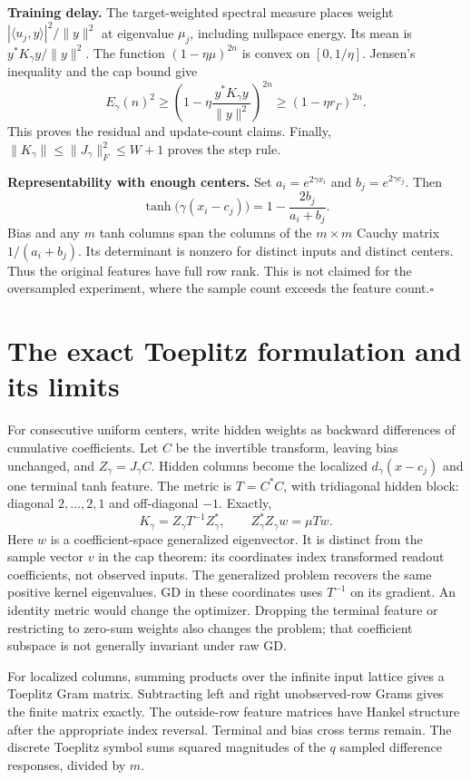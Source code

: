 \documentclass[11pt]{article}
\theoremstyle{definition}
\begin{document}
\textbf{Training delay.}
The target-weighted spectral measure places weight
$|\langle u_j,y\rangle|^2/\|y\|^2$ at eigenvalue $\mu_j$, including
nullspace energy. Its mean is $y^*K_\gamma y/\|y\|^2$.
The function $(1-\eta\mu)^{2n}$ is convex on $[0,1/\eta]$.
Jensen's inequality and the cap bound give
\[
E_\gamma(n)^2\ge
\left(1-\eta\frac{y^*K_\gamma y}{\|y\|^2}\right)^{2n}
\ge(1-\eta r_\Gamma)^{2n}.
\]
This proves the residual and update-count claims. Finally,
$\|K_\gamma\|\le\|J_\gamma\|_F^2\le W+1$ proves the step rule.

\textbf{Representability with enough centers.}
Set $a_i=e^{2\gamma x_i}$ and $b_j=e^{2\gamma c_j}$. Then
\[
\tanh\bigl(\gamma(x_i-c_j)\bigr)=1-\frac{2b_j}{a_i+b_j}.
\]
Bias and any $m$ tanh columns span the columns of the $m\times m$
Cauchy matrix $1/(a_i+b_j)$. Its determinant is nonzero for distinct
inputs and distinct centers. Thus the original features have full row
rank. This is not claimed for the oversampled experiment, where the
sample count exceeds the feature count.\hfill$\square$

\section{The exact Toeplitz formulation and its limits}
For consecutive uniform centers, write hidden weights as backward
differences of cumulative coefficients. Let $C$ be the invertible
transform, leaving bias unchanged, and $Z_\gamma=J_\gamma C$.
Hidden columns become the localized $d_\gamma(x-c_j)$ and one terminal
tanh feature. The metric is $T=C^*C$, with tridiagonal hidden block:
diagonal $2,\ldots,2,1$ and off-diagonal $-1$. Exactly,
\[
K_\gamma=Z_\gamma T^{-1}Z_\gamma^*,\qquad
Z_\gamma^*Z_\gamma w=\mu T w.
\]
Here $w$ is a coefficient-space generalized eigenvector. It is distinct
from the sample vector $v$ in the cap theorem: its coordinates index
transformed readout coefficients, not observed inputs.
The generalized problem recovers the same positive kernel eigenvalues.
GD in these coordinates uses $T^{-1}$ on its gradient. An identity metric
would change the optimizer. Dropping the terminal feature or restricting
to zero-sum weights also changes the problem; that coefficient subspace
is not generally invariant under raw GD.

For localized columns, summing products over the infinite input lattice
gives a Toeplitz Gram matrix. Subtracting left and right unobserved-row
Grams gives the finite matrix exactly. The outside-row feature matrices
have Hankel structure after the appropriate index reversal. Terminal
and bias cross terms remain. The discrete Toeplitz symbol sums squared
magnitudes of the $q$ sampled difference responses, divided by $m$.
\end{document}
